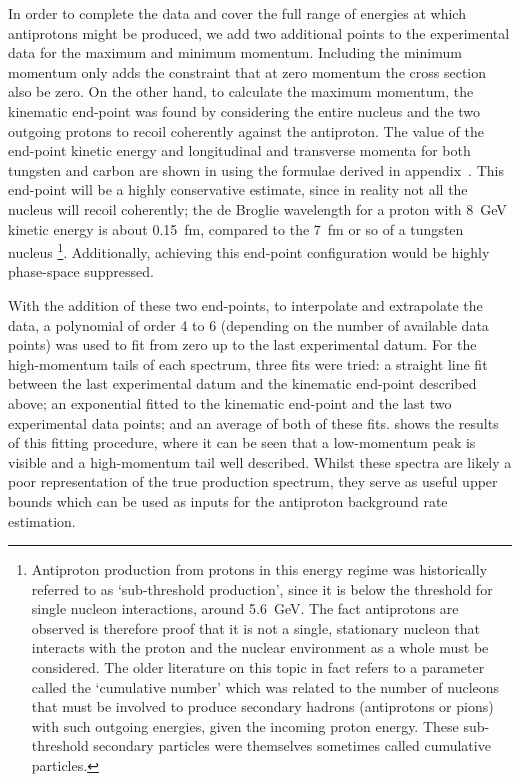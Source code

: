 \FigAntiprotonEndpoint
In order to complete the data and cover the full range of energies at which antiprotons might be produced, we add two additional points to the experimental data for the maximum and minimum momentum.
Including the minimum momentum only adds the constraint that at zero momentum the cross section also be zero.
On the other hand, to calculate the maximum momentum, the kinematic end-point was found by considering the entire nucleus and the two outgoing protons to recoil coherently against the antiproton.
The value of the end-point kinetic energy and longitudinal and transverse momenta for both tungsten and carbon are shown in  using the formulae derived in appendix~.
This end-point will be a highly conservative estimate, since in reality not all the nucleus will recoil coherently;  the de Broglie wavelength for a proton with 8~GeV kinetic energy is about 0.15~fm, compared to the 7~fm or so of a tungsten nucleus%
\footnote{Antiproton production from protons in this energy regime was historically referred to as `sub-threshold production', since it is below the threshold for single nucleon interactions, around 5.6~GeV.
The fact antiprotons are observed is therefore proof that it is not a single, stationary nucleon that interacts with the proton and the nuclear environment as a whole must be considered.
  The older literature on this topic in fact refers to a parameter called the `cumulative number' which was related to the number of nucleons that must be involved to produce secondary hadrons (\eg antiprotons or pions) with such outgoing energies, given the incoming proton energy.  
These sub-threshold secondary particles were themselves sometimes called cumulative particles.}.
Additionally, achieving this end-point configuration would be highly phase-space suppressed.

\FigAntiprotonFits
With the addition of these two end-points, to interpolate and extrapolate the data, a polynomial of order 4 to 6 (depending on the number of available data points) was used to fit from zero up to the last experimental datum.
For the high-momentum tails of each spectrum, three fits were tried: a straight line fit between the last experimental datum and the kinematic end-point described above; an exponential fitted to the kinematic end-point and the last two experimental data points; and an average of both of these fits.
 shows the results of this fitting procedure, where it can be seen that a low-momentum peak is visible and a high-momentum tail well described.
Whilst these spectra are likely a poor representation of the true production spectrum, they serve as useful upper bounds which can be used as inputs for the antiproton background rate estimation.

